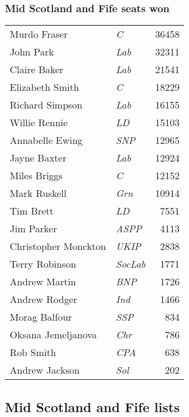 \vfill

\subsubsection*{Mid Scotland and Fife seats won}

{\footnotesize
\begin{tabular*}{\columnwidth}{@{\extracolsep{\fill}} p{} >{\itshape}l r @{\extracolsep{\fill}}}
Murdo Fraser & C & 36458\\%
John Park & Lab & 32311\\%
Claire Baker & Lab & 21541\\%
Elizabeth Smith & C & 18229\\%
Richard Simpson & Lab & 16155\\%
Willie Rennie & LD & 15103\\%
Annabelle Ewing & SNP & 12965\\%
\hline
Jayne Baxter & Lab & 12924\\
Miles Briggs & C & 12152\\
Mark Ruskell & Grn & 10914\\
Tim Brett & LD & 7551\\
Jim Parker & ASPP & 4113\\
Christopher Monckton & UKIP & 2838\\
Terry Robinson & SocLab & 1771\\
Andrew Martin & BNP & 1726\\
Andrew Rodger & Ind & 1466\\
Morag Balfour & SSP & 834\\
Oksana Jemeljanova & Chr & 786\\
Rob Smith & CPA & 638\\
Andrew Jackson & Sol & 202\\
\end{tabular*}

}

\vfill

\subsection*{Mid Scotland and Fife lists}

